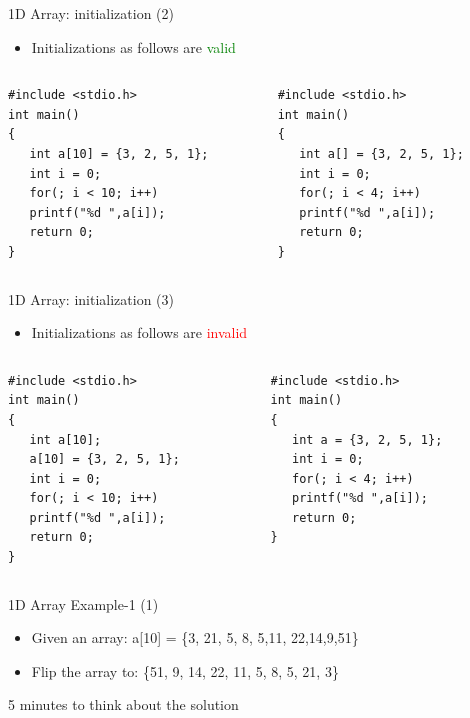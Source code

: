 \begin{frame}[fragile]{1D Array: initialization (2)}
\begin{itemize}
	\item {Initializations as follows are \textcolor{green}{valid}}
\end{itemize}
\begin{columns}
\begin{column}{0.45\linewidth}
\begin{lstlisting}
#include <stdio.h>
int main()
{
   int a[10] = {3, 2, 5, 1};
   int i = 0;
   for(; i < 10; i++)
   printf("%d ",a[i]);
   return 0;
}
\end{lstlisting}
\end{column}
\begin{column}{0.45\linewidth}
\begin{lstlisting}
#include <stdio.h>
int main()
{
   int a[] = {3, 2, 5, 1};
   int i = 0;
   for(; i < 4; i++)
   printf("%d ",a[i]);
   return 0;
}
\end{lstlisting}
\end{column}
\end{columns}
\end{frame}

\begin{frame}[fragile]{1D Array: initialization (3)}
\begin{itemize}
	\item {Initializations as follows are \textcolor{red}{invalid}}
\end{itemize}
\begin{columns}
\begin{column}{0.43\linewidth}
\begin{lstlisting}
#include <stdio.h>
int main()
{
   int a[10];
   a[10] = {3, 2, 5, 1};
   int i = 0;
   for(; i < 10; i++)
   printf("%d ",a[i]);
   return 0;
}
\end{lstlisting}
\end{column}
\begin{column}{0.43\linewidth}
\begin{lstlisting}
#include <stdio.h>
int main()
{
   int a = {3, 2, 5, 1};
   int i = 0;
   for(; i < 4; i++)
   printf("%d ",a[i]);
   return 0;
}
\end{lstlisting}
\end{column}
\end{columns}
\end{frame}

\begin{frame}{1D Array Example-1 (1)}
	\begin{itemize}
		\item {Given an array: a[10] = \{3, 21, 5, 8, 5,11, 22,14,9,51\}}
		\item {Flip the array to: \{51, 9, 14, 22, 11, 5, 8, 5, 21, 3\}}
	\end{itemize}
	\vspace{0.2in}
	\begin{center}
		\Large{5 minutes to think about the solution}
	\end{center}
\end{frame}


